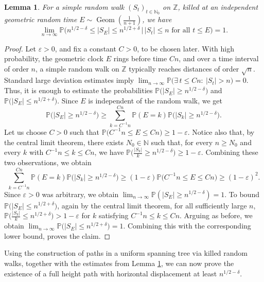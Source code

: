 \documentclass[11pt]{article}
\newtheorem{lemma}{Lemma}[section]
\newcommand{\Z}{\mathbb{Z}}
\newcommand{\Prob}{\mathbb{P}}
\begin{document}
\begin{lemma}\label{lem:estimate-killed-at-sqrt}
For a simple random walk $(S_t)_{t\in\mathbb{N}_0}$ on $\mathbb{Z}$, killed at an independent geometric random time $E\sim \operatorname{Geom}\left(\frac{1}{n+1}\right)$, we have
$$\lim_{n\to\infty}\mathbb{P}\Big(n^{1/2-\delta}\leq |S_E|\leq n^{1/2+\delta}\,\Big|\,
|S_t|\leq n \text{ for all } t\leq E\Big)=1.
$$
\end{lemma}
\begin{proof}
    Let $\varepsilon>0$, and fix a constant $C>0$, to be chosen later. With high probability, the geometric clock $E$ rings before time $Cn$, and over a time interval of order $n$, a simple random walk on $\Z$ typically reaches distances of order $\sqrt{n}$. Standard large deviation estimates imply $\lim_{n\to\infty}\Prob\bigl(\exists\, t\leq Cn:\ |S_t|>n\bigr)=0$.
     Thus, it is enough to estimate the probabilities  $\Prob\big(|S_E|\geq n^{1/2-\delta}\big)$ and $\Prob\big(|S_E|\leq n^{1/2+\delta}\big)$. Since $E$ is independent of the random walk, we get
    $$\Prob\big(|S_E|\geq n^{1/2-\delta}\big)\geq\sum_{k=C^{-1}n}^{Cn}\Prob(E=k)\Prob\big(|S_k|\geq n^{1/2-\delta}\big).$$
    Let us choose $C>0$ such that $\Prob\big(C^{-1}n \leq E \leq Cn\big) \geq 1-\varepsilon$. Notice also that, by the central limit theorem, there exists $N_0 \in \mathbb{N}$ such that, for every $n \geq N_0$ and every $k$ with $C^{-1}n \leq k \leq Cn$, we have $\Prob\big(\frac{|S_k|}{k} \geq n^{1/2-\delta}\big) \geq 1-\varepsilon$. Combining these two observations, we obtain 
    $$\sum_{k=C^{-1}n}^{Cn}\Prob(E=k)\Prob\big(|S_k|\geq n^{1/2-\delta}\big)\geq (1-\varepsilon)\Prob\big(C^{-1}n\leq E\leq Cn\big)\geq (1-\varepsilon)^2.$$
    Since $\varepsilon>0$ was arbitrary, we obtain $\lim_{n\to\infty}\Prob(|S_E|\geq n^{1/2-\delta})=1$. 
    To bound $\Prob\big(|S_E|\leq n^{1/2+\delta}\big)$, again by  the central limit theorem, for all sufficiently large $n$,
  $\Prob\big(\frac{|S_k|}{k}\leq n^{1/2+\delta}\big)>1-\varepsilon$ for $k$ satisfying $C^{-1}n\leq k\leq Cn$. Arguing as before, we obtain $\lim_{n\to\infty}\Prob\big(|S_E|\leq n^{1/2+\delta}\big)=1$. Combining this with the corresponding lower bound, proves the claim.
\end{proof}

Using the construction of paths in a uniform spanning tree via killed random walks, together with the estimates from Lemma \ref{lem:estimate-killed-at-sqrt}, we can now prove the existence of a full height path with horizontal displacement at least $n^{1/2-\delta}$.
\end{document}
